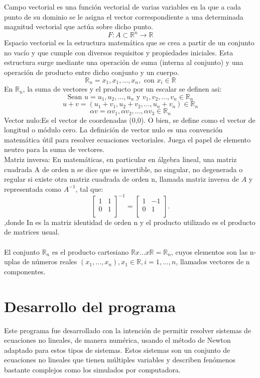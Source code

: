 ﻿\documentclass[11pt]{article}
\begin{document}
Campo vectorial es una función vectorial de varias variables en la que a cada punto de su dominio se le asigna el vector correspondiente a una determinada magnitud vectorial que actúa sobre dicho punto.$$F:A\subset\mathbb{R}^n \longrightarrow \mathbb{R}$$ 
Espacio vectorial es la estructura matemática que se crea a partir de un conjunto no vacío y que cumple con diversos requisitos y propiedades iniciales. Esta estructura surge mediante una operación de suma (interna al conjunto) y una operación de producto entre dicho conjunto y un cuerpo.
$$\mathbb{R}_n={x_1,x_1,...,x_n},\textrm{ con } x_i\in \mathbb{R}$$
En $\mathbb{R}_n$, la suma de vectores y el producto por un escalar se definen asi:
$$\textrm{Sean } u=u_1,u_2,...,u_n \textrm{ y }  v_1,v_2,...,v_n \in \mathbb{R}_n$$
$$u+v=(u_1+v_1,u_2+v_2,...,u_n+v_n)\in \mathbb{R}_n$$
$$\alpha v=\alpha v_1,\alpha v_2,...,\alpha v_3 \in \mathbb{R}_n$$
Vector nulo:Es el vector de coordenadas (0,0). O bien, se define como el vector de longitud o módulo cero. La definición de vector nulo es una convención matemática útil para resolver ecuaciones vectoriales. Juega el papel de elemento neutro para la suma de vectores.\\

Matriz inversa: En matemáticas, en particular en álgebra lineal, una matriz cuadrada A de orden n se dice que es invertible, no singular, no degenerada o regular si existe otra matriz cuadrada de orden n, llamada matriz inversa de $A$ y representada como $A^{-1}$, tal que:
$$\begin{bmatrix} 1 & 1 \\ 0 & 1 \\ \end{bmatrix}^{-1} = \begin{bmatrix} 1 & -1 \\ 0 & 1 \\ \end{bmatrix}.$$
 ,donde In es la matriz identidad de orden n y el producto utilizado es el producto de matrices usual.\\
 \\El conjunto $\mathbb{R}_n$ es el producto cartesiano $\mathbb{R}x...x\mathbb{R}=\mathbb{R}_n$, cuyos elementos son las n-uplas de números reales $(x_1,...,x_n), x_1 \in \mathbb{R},i=1,...,n$, llamados vectores de n componentes.


\section{Desarrollo del programa}
Este programa fue desarrollado con la intención de permitir resolver sistemas de ecuaciones no lineales, de manera numérica, usando el método de Newton adaptado para estos tipos de sistemas. Estos sistemas son un conjunto de ecuaciones no lineales que tienen múltiples variables y describen fenómenos bastante complejos como los simulados por computadora.
\end{document}
